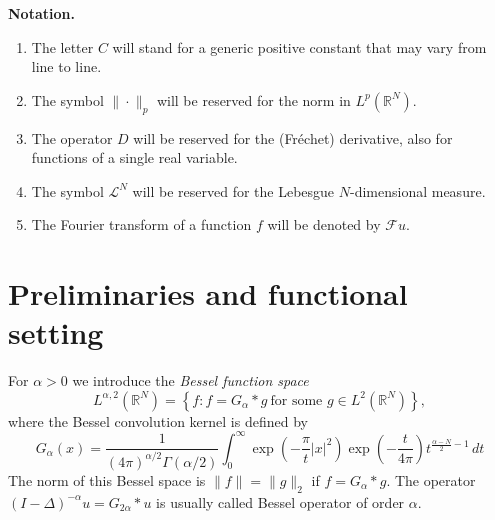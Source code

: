 \documentclass[11pt]{amsart}
\numberwithin{equation}{section}
\theoremstyle{remark}
\theoremstyle{definition}
\begin{document}
\noindent \textbf{Notation.}
\begin{enumerate}
	\item The letter $C$ will stand for a generic positive constant that
	may vary from line to line.
	\item The symbol $\|\cdot \|_p$ will be reserved for the norm in
	$L^p(\mathbb{R}^N)$.
	\item The operator $D$ will be reserved for the (Fr\'{e}chet)
	derivative, also for functions of a single real variable.
	\item The symbol $\mathcal{L}^N$ will be reserved for the Lebesgue
	$N$-dimensional measure.
	\item The Fourier transform of a function $f$ will be denoted by $\mathcal{F}u$.
\end{enumerate}

\section{Preliminaries and functional setting} \label{sec:2}
For $\alpha>0$ we introduce the \emph{Bessel function space}
\[
L^{\alpha,2}(\mathbb{R}^N) = \left\{ f \colon f=G_\alpha * g
\ \text{for some $g \in L^2(\mathbb{R}^N)$} \right\},
\]
where the Bessel convolution kernel is defined by
\begin{equation} \label{eq:G}
G_\alpha (x) = 
\frac{1}{(4 \pi )^{\alpha /2}\Gamma(\alpha/2)} \int_0^\infty \exp \left( -\frac{\pi}{t} |x|^2 \right) \exp \left( -\frac{t}{4\pi} \right) t^{\frac{\alpha - N}{2}-1} \, dt
\end{equation}
The norm of this Bessel space is $\|f\| = \|g\|_2$ if $f=G_\alpha *
g$. The operator $(I-\Delta)^{-\alpha} u = G_{2\alpha} *u$ is usually
called Bessel operator of order $\alpha$.
\end{document}
